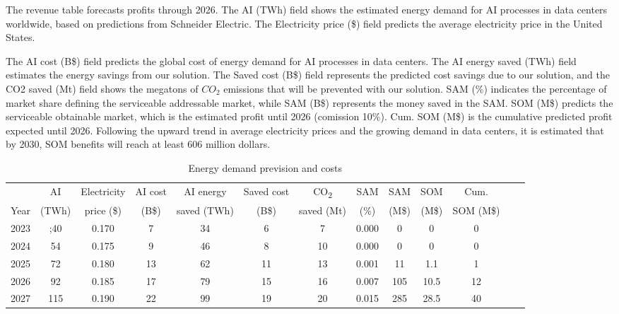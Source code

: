 The revenue table forecasts profits through 2026. The AI (TWh) field shows the estimated energy demand for AI processes in data centers worldwide, based on predictions from Schneider Electric. The Electricity price (\$) field predicts the average electricity price in the United States. 

The AI cost (B\$) field predicts the global cost of energy demand for AI processes in data centers. The AI energy saved (TWh) field estimates the energy savings from our solution. The Saved cost (B\$) field represents the predicted cost savings due to our solution, and the CO2 saved (Mt) field shows the megatons of $CO_2$ emissions that will be prevented with our solution. SAM (\%) indicates the percentage of market share defining the serviceable addressable market, while SAM (B\$) represents the money saved in the SAM. SOM (M\$) predicts the serviceable obtainable market, which is the estimated profit until 2026 (comission 10\%). Cum. SOM (M\$) is the cumulative predicted profit expected until 2026. Following the upward trend in average electricity prices and the growing demand in data centers, it is estimated that by 2030, SOM benefits will reach at least 606 million dollars.

\begin{table}[!h]
\footnotesize
\begin{tabular}{ccccccccccccc}
\toprule
 & AI & Electricity & AI cost & AI energy  & Saved cost & CO\textsubscript{2}  & SAM & SAM  & SOM  & Cum. \\
Year & (TWh) & price (\$) & (B\$) & saved (TWh) &  (B\$) & saved (Mt) & (\%) &   (M\$) & (M\$) & SOM (M\$) \\
\midrule
2023 & ;40   & 0.170   & 7   & 34  & 6   & 7   & 0.000     & 0     & 0    & 0 \\
2024 & 54  & 0.175  & 9   & 46  & 8   & 10  & 0.000     & 0      & 0    & 0 \\
2025 & 72 & 0.180   & 13  & 62  & 11  & 13  & 0.001 & 11     & 1.1  & 1 \\
2026 & 92 & 0.185  & 17  & 79  & 15  & 16  & 0.007 & 105   & 10.5 & 12 \\
2027 & 115 & 0.190  & 22  & 99  & 19  & 20  & 0.015 & 285   & 28.5 & 40 \\
\bottomrule
\end{tabular}
\caption{Energy demand prevision and costs}
\end{table}

